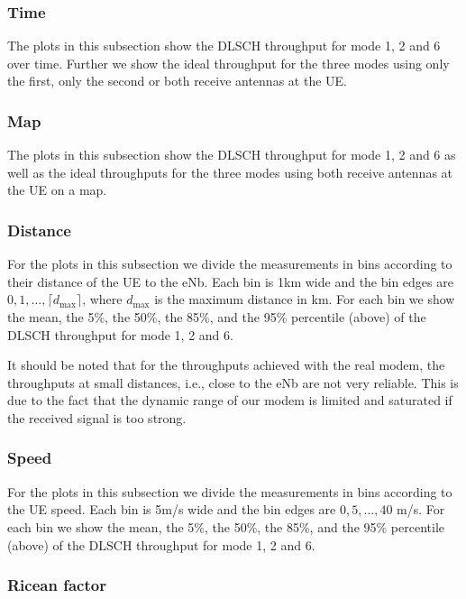 \documentclass[a4paper,10pt]{article}
\begin{document}
\subsubsection{Time}

The plots in this subsection show the DLSCH throughput for mode 1, 2 and 6 over time. Further we show the ideal throughput for the three modes using only the first, only the second or both receive antennas at the UE.


\subsubsection{Map}

The plots in this subsection show the DLSCH throughput for mode 1, 2 and 6 as well as the ideal throughputs for the three modes using  both receive antennas at the UE on a map.

\subsubsection{Distance}

For the plots in this subsection we divide the measurements in bins according to their distance of the UE to the eNb. Each bin is 1km wide and the bin edges are $0, 1, \ldots, \lceil d_{\max} \rceil$, where $d_{\max}$ is the maximum distance in km. For each bin we show the mean, the 5\%, the 50\%, the 85\%, and the 95\% percentile (above) of the DLSCH throughput for mode 1, 2 and 6. 

It should be noted that for the throughputs achieved with the real modem, the throughputs at small distances, i.e., close to the eNb are not very reliable. This is due to the fact that the dynamic range of our modem is limited and saturated if the received signal is too strong. 

\subsubsection{Speed}

For the plots in this subsection we divide the measurements in bins according to the UE speed. Each bin is 5m/s wide and the bin edges are $0,5,\ldots,40$ m/s. For each bin we show the mean, the 5\%, the 50\%, the 85\%, and the 95\% percentile (above) of the DLSCH throughput for mode 1, 2 and 6. 

\subsubsection{Ricean factor}
\end{document}
